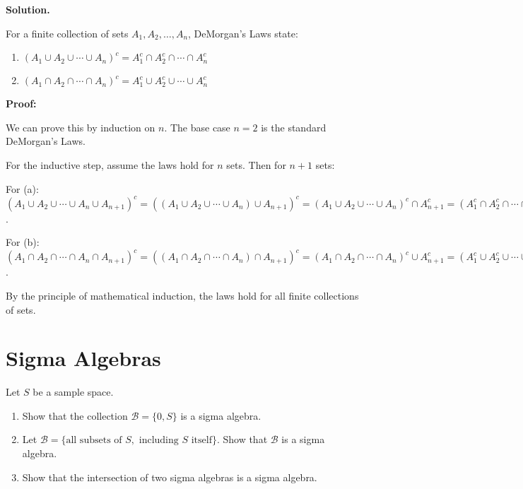 \noindent\textbf{Solution.}

For a finite collection of sets $A_1, A_2, \ldots, A_n$, DeMorgan's Laws state:
\begin{enumerate}[label=(\alph*)]
    \item $(A_1 \cup A_2 \cup \cdots \cup A_n)^c = A_1^c \cap A_2^c \cap \cdots \cap A_n^c$
    \item $(A_1 \cap A_2 \cap \cdots \cap A_n)^c = A_1^c \cup A_2^c \cup \cdots \cup A_n^c$
\end{enumerate}

\textbf{Proof:}

We can prove this by induction on $n$. The base case $n = 2$ is the standard DeMorgan's Laws.

For the inductive step, assume the laws hold for $n$ sets. Then for $n + 1$ sets:

For (a): $(A_1 \cup A_2 \cup \cdots \cup A_n \cup A_{n+1})^c = ((A_1 \cup A_2 \cup \cdots \cup A_n) \cup A_{n+1})^c = (A_1 \cup A_2 \cup \cdots \cup A_n)^c \cap A_{n+1}^c = (A_1^c \cap A_2^c \cap \cdots \cap A_n^c) \cap A_{n+1}^c = A_1^c \cap A_2^c \cap \cdots \cap A_n^c \cap A_{n+1}^c$.

For (b): $(A_1 \cap A_2 \cap \cdots \cap A_n \cap A_{n+1})^c = ((A_1 \cap A_2 \cap \cdots \cap A_n) \cap A_{n+1})^c = (A_1 \cap A_2 \cap \cdots \cap A_n)^c \cup A_{n+1}^c = (A_1^c \cup A_2^c \cup \cdots \cup A_n^c) \cup A_{n+1}^c = A_1^c \cup A_2^c \cup \cdots \cup A_n^c \cup A_{n+1}^c$.

By the principle of mathematical induction, the laws hold for all finite collections of sets.


\section{Sigma Algebras}

\begin{problembox}
Let $S$ be a sample space.
\begin{enumerate}[label=(\alph*)]
    \item Show that the collection $\mathcal{B} = \{0, S\}$ is a sigma algebra.
    \item Let $\mathcal{B} = \{\text{all subsets of } S, \text{ including } S \text{ itself}\}$. Show that $\mathcal{B}$ is a sigma algebra.
    \item Show that the intersection of two sigma algebras is a sigma algebra.
\end{enumerate}
\end{problembox}

